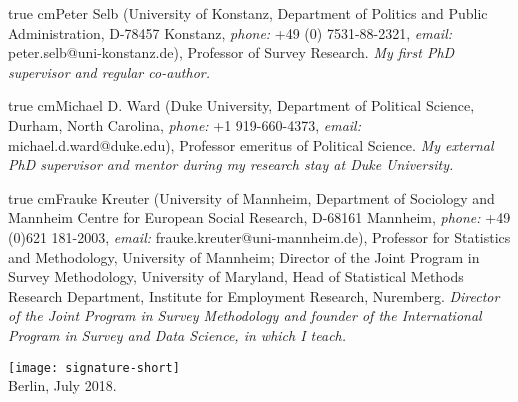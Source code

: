\documentclass[11pt,article,oneside]{memoir}   %
\def\mybibind{\vspace{0.1in} \noindent \hangindent=1 true cm\hangafter=1}
\begin{document}


\mybibind Peter Selb (University of Konstanz, Department of Politics and Public Administration, D-78457 Konstanz, \emph{phone:} +49 (0) 7531-88-2321, \emph{email:} peter.selb@uni-konstanz.de), Professor of Survey Research. \emph{My first PhD supervisor and regular co-author.} 

\mybibind Michael D. Ward (Duke University, Department of Political Science, Durham, North Carolina, \emph{phone:} +1 919-660-4373, \emph{email:} michael.d.ward@duke.edu), Professor emeritus of Political Science. \emph{My external PhD supervisor and mentor during my research stay at Duke University.} 


\mybibind Frauke Kreuter (University of Mannheim, Department of Sociology and Mannheim Centre for European Social Research, D-68161 Mannheim, \emph{phone:} +49 (0)621 181-2003, \emph{email:} frauke.kreuter@uni-mannheim.de), Professor for Statistics and Methodology, University of Mannheim; Director of the Joint Program in Survey Methodology, University of Maryland, Head of Statistical Methods Research Department, Institute for Employment Research, Nuremberg. \emph{Director of the Joint Program in Survey Methodology and founder of the International Program in Survey and Data Science, in which I teach.} 


\bigskip 
\begin{flushright}
 \texttt{[image: signature-short]} \\
\hfill Berlin, July 2018.
\end{flushright}
\end{document}
